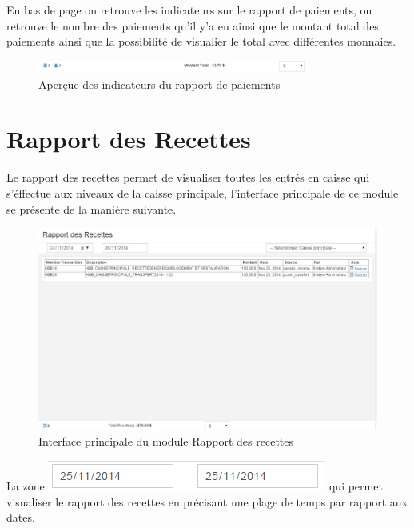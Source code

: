 \documentclass[12pt,a4paper]{report}
\begin{document}
En bas de page on retrouve les indicateurs sur le rapport de paiements, on retrouve le nombre des paiements qu'il y'a eu ainsi que le montant total des paiements ainsi que la possibilité de visualier le total avec différentes monnaies. 

\begin{figure}[h]
\begin{center}
\includegraphics[width=9cm]{pic/IndRapPaiement.png}
\end{center}
\caption{Aperçue des indicateurs du rapport de paiements}
\label{Aperçue des indicateurs du rapport de paiements}
\end{figure}


\newpage
\section{Rapport des Recettes}
Le rapport des recettes permet de visualiser toutes les entrés en caisse qui s'éffectue aux niveaux de la caisse principale, l'interface principale de ce module se présente de la manière suivante.

\begin{figure}[h]
\begin{center}
\includegraphics[width=14cm]{pic/RapportRecette.png}
\end{center}
\caption{Interface principale du module Rapport des recettes}
\label{Interface principale du module Rapport des recettes}
\end{figure}

La zone  \includegraphics[scale=0.7]{pic/PlageTimes.png} qui permet visualiser le rapport des recettes en précisant une plage de temps par rapport aux dates.
\end{document}
